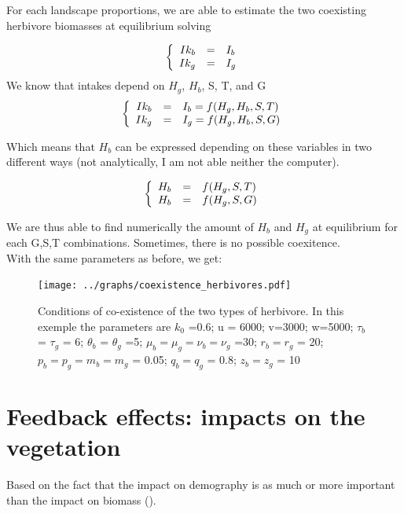 \newpage 
For each landscape proportions, we are able to estimate the two
coexisting herbivore biomasses at equilibrium solving

\[
\left\{
\begin{array}{r c l}
Ik_b &=& I_b \\
Ik_g &=& I_g
\end{array}
\right.
\]
We know that intakes depend on $H_g$, $H_b$, S, T, and G
\[
\left\{
\begin{array}{r c l}
Ik_b &=& I_b = f(H_g, H_b, S, T) \\
Ik_g &=& I_g = f(H_g, H_b, S, G)
\end{array}
\right.
\]

Which means that $H_b$ can be expressed depending on these variables in two
different ways (not analytically, I am not able neither the computer).

\[
\left\{
\begin{array}{r c l}
H_b &=& f(H_g, S, T) \\
H_b &=& f(H_g, S, G)
\end{array}
\right.
\]

We are thus able to find numerically the amount of $H_b$ and $H_g$ at
equilibrium for each {G,S,T} combinations. Sometimes, there is no possible
coexitence. \\

With the same parameters as before, we get:

\begin{figure}
\texttt{[image: ../graphs/coexistence\_herbivores.pdf]}
  \caption{Conditions of co-existence of the two types of herbivore. In this exemple the parameters are $k_0$ =0.6; u = 6000; v=3000; w=5000; $\tau_b$ = $\tau_g$ = 6; $\theta_b$ = $\theta_g$ =5; $\mu_b = \mu_g = \nu_b = \nu_g$ =30; $r_b = r_g$ = 20; $p_b = p_g = m_b = m_g$ = 0.05; $q_b = q_g$ = 0.8; $z_b = z_g$ = 10}
\label{coexistenceH}
\end{figure}

\newpage


\section{Feedback effects: impacts on the vegetation}

Based on the fact that the impact on demography is as much or more important
than the impact on biomass (\cite{Moncrieff2014}).

